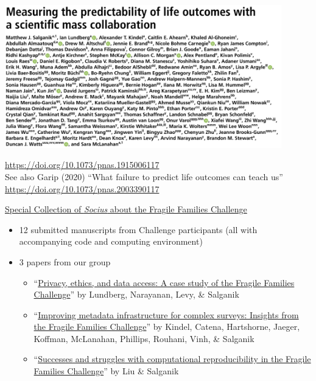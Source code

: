 \documentclass[aspectratio=169]{beamer}
\begin{document}
\begin{frame}

\begin{center}
\includegraphics[width=0.9\textwidth]{figures/salganik_measuring_2020_title_authors}
\end{center}

\vfill
\url{https://doi.org/10.1073/pnas.1915006117}\\
See also Garip (2020) ``What failure to predict life outcomes can teach us'' \url{https://doi.org/10.1073/pnas.2003390117}

\end{frame}
\begin{frame}

\href{https://journals.sagepub.com/topic/collections-srd/srd-1-fragile_families/srd}{Special Collection of \textit{Socius} about the Fragile Families Challenge}
\begin{itemize}
\item 12 submitted manuscripts from Challenge participants (all with accompanying code and computing environment) \pause
\item 3 papers from our group \pause
\begin{itemize}
\item ``\href{https://doi.org/10.1177/2378023118813023}{Privacy, ethics, and data access: A case study of the Fragile Families Challenge}'' by Lundberg, Narayanan, Levy, \& Salganik \pause
\item ``\href{https://doi.org/10.1177/2378023118817378}{Improving metadata infrastructure for complex surveys: Insights from the Fragile Families Challenge}'' by Kindel, Catena, Hartshorne, Jaeger, Koffman, McLanahan, Phillips, Rouhani, Vinh, \& Salganik \pause
\item ``\href{https://doi.org/10.1177/2378023119849803}{Successes and struggles with computational reproducibility in the Fragile Families Challenge}'' by Liu \& Salganik
\end{itemize}
\end{itemize}

\end{frame}
\end{document}
